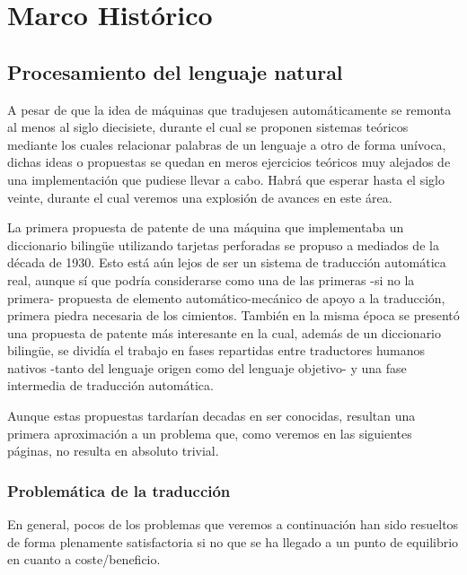 \chapter{Marco Histórico}
\label{chap:marco}
\section{Procesamiento del lenguaje natural}

A pesar de que la idea de máquinas que tradujesen automáticamente se remonta al
menos al siglo diecisiete, durante el cual se proponen sistemas teóricos mediante los
cuales relacionar palabras de un lenguaje a otro de forma unívoca, dichas ideas
o propuestas se quedan en meros ejercicios teóricos muy alejados de una
implementación que pudiese llevar a cabo. Habrá que esperar hasta el siglo
veinte, durante el cual veremos una explosión de avances en este área.

La primera propuesta de patente de una máquina que implementaba un diccionario
bilingüe utilizando tarjetas perforadas se propuso a mediados de la década de
1930. Esto está aún lejos de ser un sistema de traducción automática real,
aunque sí que podría considerarse como una de las primeras -si no la primera-
propuesta de elemento automático-mecánico de apoyo a la traducción, primera
piedra necesaria de los cimientos.
También en la misma época se presentó una propuesta de patente más interesante
en la cual, además de un diccionario bilingüe, se dividía el trabajo en fases
repartidas entre traductores humanos nativos -tanto del lenguaje origen como del
lenguaje objetivo- y una fase intermedia de traducción automática.

Aunque estas propuestas tardarían decadas en ser conocidas, resultan una
primera aproximación a un problema que, como veremos en las siguientes páginas,
no resulta en absoluto trivial.

\subsection{Problemática de la traducción}
En general, pocos de los problemas que veremos a continuación han sido resueltos
de forma plenamente satisfactoria si no que se ha llegado a un punto de
equilibrio en cuanto a coste/beneficio.

